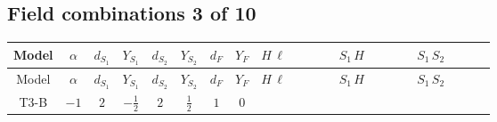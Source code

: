 \documentclass[8pt]{article}
\begin{document}
\begin{landscape}
\subsection*{Field combinations 3 of 10}
\begin{longtable}{@{}cccccccc >{\raggedright\arraybackslash}p{0.21\linewidth} >{\raggedright\arraybackslash}p{0.21\linewidth} >{\raggedright\arraybackslash}p{0.21\linewidth}@{}}
\toprule
Model & $\alpha$ & $d_{S_1}$ & $Y_{S_1}$ & $d_{S_2}$ & $Y_{S_2}$ & $d_F$ & $Y_F$ & $H\,\ell$ & $S_1\,H$ & $S_1\,S_2$ \\
\midrule
\endfirsthead
\toprule
Model & $\alpha$ & $d_{S_1}$ & $Y_{S_1}$ & $d_{S_2}$ & $Y_{S_2}$ & $d_F$ & $Y_F$ & $H\,\ell$ & $S_1\,H$ & $S_1\,S_2$ \\
\midrule
\endhead
T3-B & $-1$ & $2$ & $-\frac{1}{2}$ & $2$ & $\frac{1}{2}$ & $1$ & $0$ & \scriptsize\adjustbox{max width=\linewidth}{$\begin{gathered} +\frac{2 \hbar  \overline{y_{1,i_1,r_1}} \overline{y_{2,i_2,r_1}} L_{a_4,i_2}{}^T\, C\, P_L\, L_{a_2,i_1} H_{a_1} H_{a_3} \lambda_{T3} \epsilon_{a_1,a_2} \epsilon_{a_3,a_4}}{\sqrt{3} \epsilon  M_F} \\ +\frac{2 \hbar  \overline{y_{1,i_1,r_1}} \overline{y_{2,i_2,r_1}} L_{a_4,i_2}{}^T\, C\, P_L\, L_{a_2,i_1} H_{a_1} H_{a_3} \lambda_{T3} \epsilon_{a_1,a_2} \epsilon_{a_3,a_4}}{\sqrt{3} M_F} \\ +\frac{2 \hbar  \overline{\lambda_{T3}} \overline{L_{a_3,i_1}}\, C\, P_R\, \overline{L_{a_4,i_2}}{}^T y_{1,i_1,r_1} y_{2,i_2,r_1} \epsilon_{a_1,a_3} \epsilon_{a_2,a_4} H_{a_1}{}^{\dagger } H_{a_2}{}^{\dagger }}{\sqrt{3} \epsilon  M_F}\end{gathered}$} & \scriptsize\adjustbox{max width=\linewidth}{$\begin{gathered} +\frac{2 \hbar  \overline{y_{2,i_1,r_1}} H_{a_1} H_{a_2} S_{1,j_1} S_{1,j_2} y_{1,i_1,r_1} \lambda_{T3} {\mathcal{I}_{y_2}}^{*}_{a_1,j_1} {\mathcal{I}_{y_2}}^{*}_{a_2,j_2}}{\sqrt{3} \epsilon } \\ +\frac{\hbar  \overline{y_{2,i_1,r_1}} H_{a_1} H_{a_2} S_{1,j_1} S_{1,j_2} y_{1,i_1,r_1} \lambda_{T3} {\mathcal{I}_{y_2}}^{*}_{a_1,j_1} {\mathcal{I}_{y_2}}^{*}_{a_2,j_2}}{\sqrt{3}} \\ -\frac{2 \hbar  \overline{y_{1,i_1,r_1}} \overline{Y_{e,i_2,i_3}} H_{a_2} S_{1,j_2} y_{1,i_2,r_1} Y_{e,i_1,i_3} \mathcal{I}_{y_1,a_1,j_2} {\mathcal{I}_{y_1}}^{*}_{a_2,j_1} H_{a_1}{}^{\dagger } S_{1,j_1}{}^{\dagger }}{\epsilon }\end{gathered}$} & \scriptsize\adjustbox{max width=\linewidth}{$\begin{gathered} +\text{CNewScalar1NewScalar2} \hbar  S_{1,j_1} S_{2,j_2} \text{Bar}(\text{cg1})_{j_1,j_2} \\ +\frac{1}{2} C_{S_2^\dagger S_2} \hbar  \overline{y_{2,i_1,r_1}} S_{1,j_1} S_{2,j_2} y_{1,i_1,r_1} \text{Bar}(\text{cg1})_{j_1,j_2} \\ +\frac{C_{S_2^\dagger S_2} \hbar  \overline{y_{2,i_1,r_1}} S_{1,j_1} S_{2,j_2} y_{1,i_1,r_1} \text{Bar}(\text{cg1})_{j_1,j_2}}{\epsilon }\end{gathered}$} \\

\end{longtable}
\end{landscape}
\end{document}

